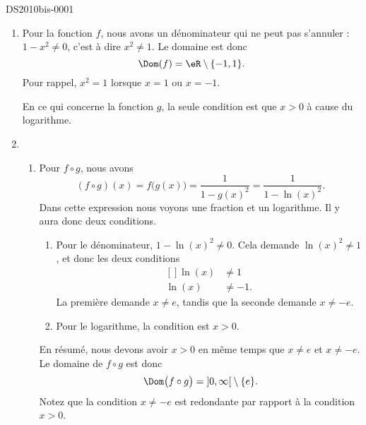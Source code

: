 
\begin{corrige}{DS2010bis-0001}

	\begin{enumerate}
		\item
			Pour la fonction  $f$, nous avons un dénominateur qui ne peut pas s'annuler : $1-x^2\neq 0$, c'est à dire $x^2\neq 1$. Le domaine est donc 
			\begin{equation}
				\Dom(f)=\eR\setminus\{ -1,1 \}.
			\end{equation}
			Pour rappel, $x^2=1$ lorsque $x=1$ ou $x=-1$.

			En ce qui concerne la fonction $g$, la seule condition est que $x>0$ à cause du logarithme.
		\item
			\begin{enumerate}
				\item
					Pour $f\circ g$, nous avons
					\begin{equation}
						(f\circ g)(x)=f\big( g(x) \big)=\frac{1}{ 1-g(x)^2 }=\frac{1}{ 1-\ln(x)^2 }.
					\end{equation}
					Dans cette expression nous voyons une fraction et un logarithme. Il y aura donc deux conditions.
					\begin{enumerate}
						\item
							Pour le dénominateur, $1-\ln(x)^2\neq 0$. Cela demande $\ln(x)^2\neq 1$, et donc les deux conditions
							\begin{equation}
								\begin{aligned}[]
									\ln(x)&\neq 1\\
									\ln(x)&\neq -1.
								\end{aligned}
							\end{equation}
							La première demande $x\neq e$, tandis que la seconde demande $x\neq -e$.
						\item
							Pour le logarithme, la condition est $x>0$.
					\end{enumerate}
					En résumé, nous devons avoir $x>0$ en même temps que $x\neq e$ et $x\neq -e$. Le domaine de $f\circ g$ est donc
					\begin{equation}
						\Dom\big( f\circ g \big)=\mathopen] 0 , \infty \mathclose[\setminus\{ e \}.
					\end{equation}
					Notez que la condition $x\neq -e$ est redondante par rapport à la condition $x>0$.


\end{enumerate}
\end{enumerate}
\end{corrige}
